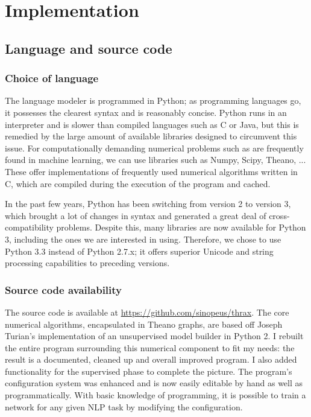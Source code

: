 
\chapter{Implementation}
\label{chp:implementation}

\section{Language and source code}
\label{sec:langsource}
\subsection{Choice of language}
\label{sec:language}
The language modeler is programmed in Python; as programming languages
go, it possesses the clearest syntax and is reasonably concise. Python
runs in an interpreter and is slower than compiled languages such as C
or Java, but this is remedied by the large amount of available
libraries designed to circumvent this issue. For computationally
demanding numerical problems such as are frequently found in machine
learning, we can use libraries such as Numpy, Scipy, Theano, ... These
offer implementations of frequently used numerical algorithms written
in C, which are compiled during the execution of the program and cached. 

In the past few years, Python has been switching from version 2 to
version 3, which brought a lot of changes in syntax and generated a
great deal of cross-compatibility problems. Despite this, many
libraries are now available for Python 3, including the ones we are
interested in using. Therefore, we chose to use Python 3.3 instead of
Python 2.7.x; it offers superior Unicode and string processing
capabilities to preceding versions.

\subsection{Source code availability}
\label{sec:sourcecode}
The source code is available at
\url{https://github.com/sinopeus/thrax}. The core numerical
algorithms, encapsulated in Theano graphs, are based off Joseph
Turian's implementation of an unsupervised model builder in Python
2. I rebuilt the entire program surrounding this numerical component
to fit my needs: the result is a documented, cleaned up and overall
improved program. I also added functionality for the supervised phase
to complete the picture. The program's configuration system was
enhanced and is now easily editable by hand as well as
programmatically. With basic knowledge of programming, it is possible
to train a network for any given NLP task by modifying the
configuration.

